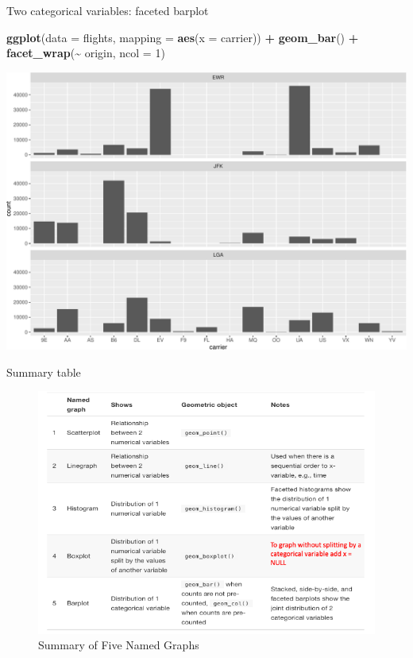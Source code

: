 \documentclass[
  ignorenonframetext,
]{beamer}
\newenvironment{Shaded}{\begin{snugshade}}{\end{snugshade}}
\newcommand{\AttributeTok}[1]{\textcolor[rgb]{0.13,0.29,0.53}{#1}}
\newcommand{\DecValTok}[1]{\textcolor[rgb]{0.00,0.00,0.81}{#1}}
\newcommand{\FunctionTok}[1]{\textcolor[rgb]{0.13,0.29,0.53}{\textbf{#1}}}
\newcommand{\NormalTok}[1]{#1}
\newcommand{\SpecialCharTok}[1]{\textcolor[rgb]{0.81,0.36,0.00}{\textbf{#1}}}
\begin{document}
\begin{frame}[fragile]{Two categorical variables: faceted barplot}
\protect\hypertarget{two-categorical-variables-faceted-barplot}{}
\tiny

\begin{Shaded}
\begin{Highlighting}[]
\FunctionTok{ggplot}\NormalTok{(}\AttributeTok{data =}\NormalTok{ flights, }\AttributeTok{mapping =} \FunctionTok{aes}\NormalTok{(}\AttributeTok{x =}\NormalTok{ carrier)) }\SpecialCharTok{+}
  \FunctionTok{geom\_bar}\NormalTok{() }\SpecialCharTok{+}
  \FunctionTok{facet\_wrap}\NormalTok{(}\SpecialCharTok{\textasciitilde{}}\NormalTok{ origin, }\AttributeTok{ncol =} \DecValTok{1}\NormalTok{)}
\end{Highlighting}
\end{Shaded}

\begin{center}\includegraphics[width=0.7\linewidth,height=0.6\textheight]{Week2_files/figure-beamer/unnamed-chunk-47-1} \end{center}
\normalsize
\end{frame}

\begin{frame}{Summary table}
\protect\hypertarget{summary-table}{}
\begin{figure}[h]

{\centering \includegraphics[width=0.8\linewidth,height=0.7\textheight]{week2_5} 

}

\caption{Summary of Five Named Graphs}\label{fig:unnamed-chunk-48}
\end{figure}
\end{frame}
\end{document}
